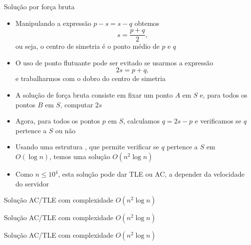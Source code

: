 \begin{frame}[fragile]{Solução por força bruta}

    \begin{itemize}
        \item Manipulando a expressão $p - s = s - q$ obtemos
        \[
            s = \frac{p + q}{2},
        \]
        ou seja, o centro de simetria é o ponto médio de $p$ e $q$

        \item O uso de ponto flutuante pode ser evitado se usarmos a expressão
        \[
            2s = p + q,
        \]
        e trabalharmos com o dobro do centro de simetria

        \item A solução de força bruta consiste em fixar um ponto $A$ em $S$ e, para todos os
        pontos $B$ em $S$, computar $2s$ 

        \item Agora, para todos os pontos $p$ em $S$, calculamos $q = 2s - p$ e verificamos se
            $q$ pertence a $S$ ou não

        \item Usando uma estrutura , que permite verificar se $q$ pertence a $S$ em
            $O(\log n)$, temos uma solução $O(n^2\log n)$

        \item Como $n\leq 10^4$, esta solução pode dar TLE ou AC, a depender da velocidade do
            servidor
    \end{itemize}

\end{frame}

\begin{frame}[fragile]{Solução AC/TLE com complexidade $O(n^2\log n)$}
\end{frame}

\begin{frame}[fragile]{Solução AC/TLE com complexidade $O(n^2\log n)$}
\end{frame}

\begin{frame}[fragile]{Solução AC/TLE com complexidade $O(n^2\log n)$}
\end{frame}

